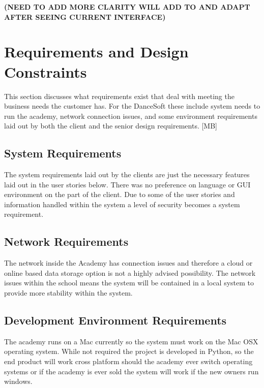 \bf(NEED TO ADD MORE CLARITY WILL ADD TO AND ADAPT AFTER SEEING CURRENT INTERFACE)

\section{Requirements and Design Constraints}
This section discusses what requirements exist that deal with meeting the business needs the customer has. For the DanceSoft these include system needs to run the academy, network connection issues, and some environment requirements laid out by both the client and the senior design requirements. [MB]


\subsection{System  Requirements}
The system requirements laid out by the clients are just the necessary features laid out in the user stories below. There was no preference on language or GUI environment on the part of the client. Due to some of the user stories and information handled within the system a level of security becomes a system requirement. 


\subsection{Network Requirements}
The network inside the Academy has connection issues and therefore a cloud or online based data storage option is not a highly advised possibility. The network issues within the school means the system will be contained in a local system to provide more stability within the system.


\subsection{Development Environment Requirements}
The academy runs on a Mac currently so the system must work on the Mac OSX operating system. While not required the project is developed in Python, so the end product will work cross platform should the academy ever switch operating systems or if the academy is ever sold the system will work if the new owners run windows.


